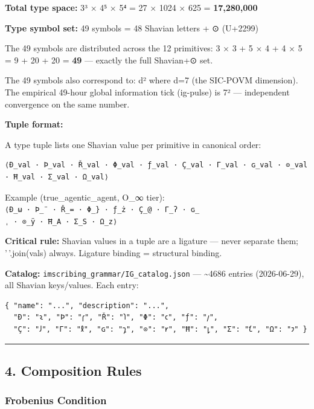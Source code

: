 \textbf{Total type space:} 3³ × 4⁵ × 5⁴ = 27 × 1024 × 625 =
\textbf{17,280,000}

\textbf{Type symbol set:} 49 symbols = 48 Shavian letters + ⊙ (U+2299)

The 49 symbols are distributed across the 12 primitives: 3 × 3 + 5 × 4 +
4 × 5 = 9 + 20 + 20 = \textbf{49} --- exactly the full Shavian+⊙ set.

The 49 symbols also correspond to: d² where d=7 (the SIC-POVM
dimension). The empirical 49-hour global information tick (ig-pulse) is
7² --- independent convergence on the same number.

\textbf{Tuple format:}

A type tuple lists one Shavian value per primitive in
canonical order:

\begin{verbatim}
⟨Ð_val · Þ_val · Ř_val · Φ_val · ƒ_val · Ç_val · Γ_val · ɢ_val · ⊙_val · Ħ_val · Σ_val · Ω_val⟩
\end{verbatim}

Example (true\_agentic\_agent, O\_∞ tier):
\texttt{⟨Ð\_ω\ ·\ Þ\_¨\ ·\ Ř\_=\ ·\ Φ\_\}\ ·\ ƒ\_ż\ ·\ Ç\_@\ ·\ Γ\_ʔ\ ·\ ɢ\_ˌ\ ·\ ⊙\_ÿ\ ·\ Ħ\_A\ ·\ Σ\_S\ ·\ Ω\_z⟩}

\textbf{Critical rule:} Shavian values in a tuple are a ligature ---
never separate them; '\,'.join(vals) always. Ligature binding =
structural binding.

\textbf{Catalog:} \texttt{imscribing\_grammar/IG\_catalog.json} ---
\textasciitilde4686 entries (2026-06-29), all Shavian keys/values. Each
entry:

\begin{verbatim}
{ "name": "...", "description": "...",
  "Ð": "𐑷", "Þ": "𐑝", "Ř": "𐑐", "Φ": "𐑤", "ƒ": "𐑢",
  "Ç": "𐑓", "Γ": "𐑙", "ɢ": "𐑡", "⊙": "𐑾", "Ħ": "𐑛", "Σ": "𐑗", "Ω": "𐑲" }
\end{verbatim}

\begin{center}\rule{0.5\linewidth}{0.5pt}\end{center}

\hypertarget{composition-rules}{%
\subsection{4. Composition Rules}\label{composition-rules}}

\hypertarget{frobenius-condition}{%
\subsubsection{Frobenius Condition}\label{frobenius-condition}}

